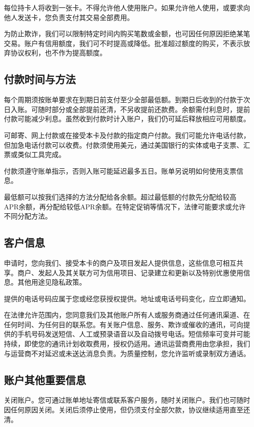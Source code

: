 \documentclass[UTF8,fontset=none,11pt,a4paper]{ctexart}
\begin{document}
每位持卡人将收到一张卡。不得允许他人使用账户。如果允许他人使用，或要求向他人发送卡，您负责支付其交易全部费用。


为防止欺诈，我们可以限制特定时间内购买笔数或金额，也可因任何原因拒绝某笔交易。账户有信用额度，我们可不时提高或降低。批准超过额度的购买，不表示放弃协议权利，也不作为提高额度。


\subsection*{付款时间与方法}
每个周期须按账单要求在到期日前支付至少全部最低额。到期日后收到的付款于次日入账。可随时部分或全部提前还清，不另收提前还款费。余额需付利息时，提前付款可能减少利息。虽然收到付款时计入账户，我们仍可延后释放相应可用额度。


可邮寄、网上付款或在接受本卡及付款的指定商户付款。我们可能允许电话付款，但加急电话付款可以收费。付款须使用美元，通过美国银行的实体或电子支票、汇票或类似工具完成。


付款须遵守账单指示，否则入账可能延迟最多五日。账单另说明如何使用支票信息。


最低额可以按我们选择的方法分配给各余额。超过最低额的付款先分配给较高APR余额，再分配给较低APR余额。在特定促销等情况下，法律可能要求或允许不同分配方法。


\subsection*{客户信息}
申请时，您向我们、接受本卡的商户及项目发起人提供信息，这些信息可相互共享。商户、发起人及其关联方可为信用项目、记录建立和更新以及特别优惠使用信息。其他用途见隐私政策。


提供的电话号码应属于您或经您获授权提供。地址或电话号码变化，应立即通知。


在法律允许范围内，您同意我们及其他账户所有人或服务商通过任何通讯渠道、在任何时间、为任何目的联系您。有关账户信息、服务、欺诈或催收的通讯，可向提供的手机号码发送短信、人工或预录语音以及自动拨号电话。短信频率可变并可能持续，即使您的通讯计划收取费用，授权仍适用。通讯运营商费用由您承担，我们与运营商不对延迟或未送达消息负责。为质量控制，您允许监听或录制双方通话。


\subsection*{账户其他重要信息}
关闭账户。您可通过账单地址寄信或联系客户服务，随时关闭账户。我们也可随时因任何原因关闭。关闭后须停止使用，但仍须支付全部欠款，协议继续适用直至还清。
\end{document}
